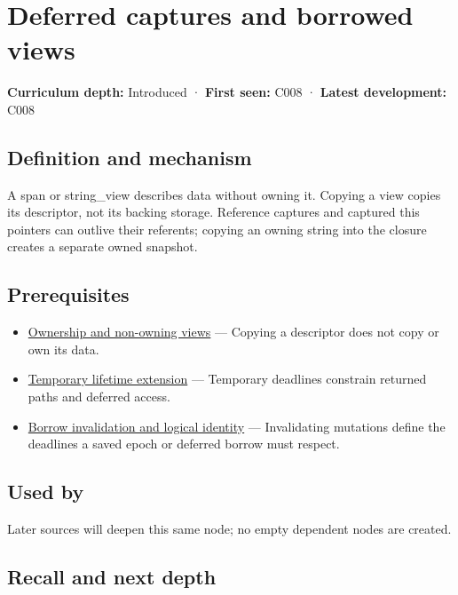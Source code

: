 \hypertarget{appendix-aea529eb5175}{}\label{referencestart:appendix-aea529eb5175}
\section{Deferred captures and borrowed views}\label{appendix-aea529eb5175-deferred-captures-and-borrowed-views}

\textbf{Curriculum depth:} Introduced · \textbf{First seen:} C008 · \textbf{Latest development:} C008

\subsection{Definition and mechanism}\label{appendix-aea529eb5175-definition-and-mechanism}

A span or string\_view describes data without owning it. Copying a view copies its descriptor, not its backing storage. Reference captures and captured this pointers can outlive their referents; copying an owning string into the closure creates a separate owned snapshot.

\subsection{Prerequisites}\label{appendix-aea529eb5175-prerequisites}

\begin{itemize}
\tightlist
\item
  \hyperref[appendix-d52e4486f527]{Ownership and non-owning views} --- Copying a descriptor does not copy or own its data.
\item
  \hyperref[appendix-a978b29bbbb0]{Temporary lifetime extension} --- Temporary deadlines constrain returned paths and deferred access.
\item
  \hyperref[appendix-f9b8b9188c7f]{Borrow invalidation and logical identity} --- Invalidating mutations define the deadlines a saved epoch or deferred borrow must respect.
\end{itemize}

\subsection{Used by}\label{appendix-aea529eb5175-used-by}

Later sources will deepen this same node; no empty dependent nodes are created.

\subsection{Recall and next depth}\label{appendix-aea529eb5175-recall-and-next-depth}

